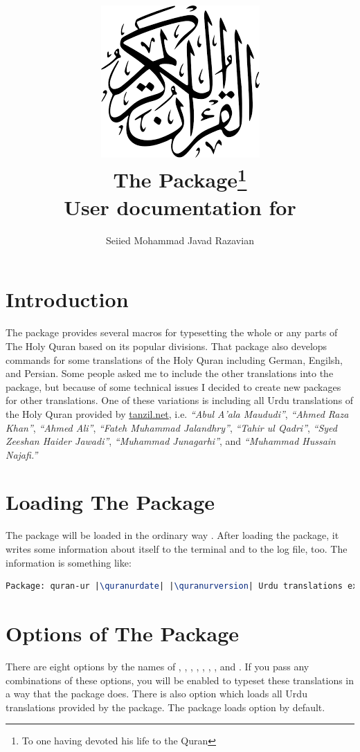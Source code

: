 \documentclass[a4paper]{ltxdoc}
\title{\includegraphics[scale=.3]{quran.png}\\
The \xpackage{quran-ur} Package\footnote{To one having devoted his life to the Quran}\\
\Large User documentation for \quranurversion}
\author{Seiied Mohammad Javad Razavian\\\xemail{javadr@gmail.com}}
\date{\quranurdate}
\begin{document}
\maketitle

\tableofcontents

\vfill
\section{Introduction}
The  package provides several macros for
typesetting the whole or any parts of The Holy Quran based on its popular divisions. That package also develops 
commands for some translations of the Holy Quran including German, Engilsh, and Persian. 
Some people asked me to include the other translations into the  package, 
but because of some technical issues I decided to create new packages for other translations. 
One of these variations is  including all Urdu translations of the Holy Quran 
provided by \url{tanzil.net}, i.e. 
\emph{``Abul A'ala Maududi''}, \emph{``Ahmed Raza Khan''}, 
\emph{``Ahmed Ali''}, \emph{``Fateh Muhammad Jalandhry''},
\emph{``Tahir ul Qadri''}, \emph{``Syed Zeeshan Haider Jawadi''}, 
\emph{``Muhammad Junagarhi''}, and \emph{``Muhammad Hussain Najafi.''}


\newpage
\section{Loading The Package}
The package will be loaded in the ordinary way
.
After loading the package, it writes some information about itself to the
terminal and to the log file, too. The information is something like:

\begin{lstlisting}[style=BashInputStyle, language=tex, escapechar={|}]
Package: quran-ur |\quranurdate| |\quranurversion| Urdu translations extension to the quran package.
\end{lstlisting}


\section{Options of The Package}\label{sec:qurantypesetting}
There are eight options by the names of , , , 
, , , , and .
If you pass any combinations of these options, you will be enabled to typeset these translations in a way 
that the  package does. 
There is also  option which loads all Urdu translations provided by the  package.
The package loads  option by default.
\end{document}
